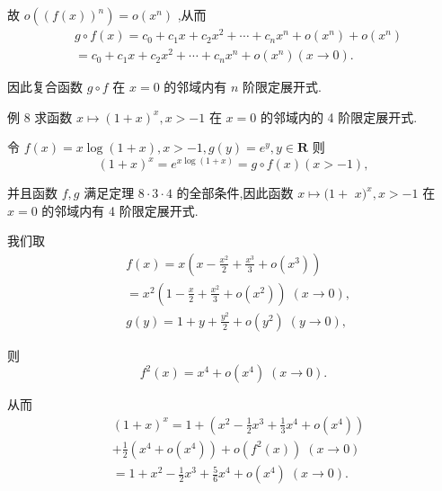 故 $o\left( {\left( f\left( x\right) \right) }^{n}\right)  = o\left( {x}^{n}\right)$ ,从而
\begin{align*}
	&g \circ  f\left( x\right)  = {c}_{0} + {c}_{1}x + {c}_{2}{x}^{2} + \cdots  + {c}_{n}{x}^{n} + o\left( {x}^{n}\right)  + o\left( {x}^{n}\right)\\
	&= {c}_{0} + {c}_{1}x + {c}_{2}{x}^{2} + \cdots  + {c}_{n}{x}^{n} + o\left( {x}^{n}\right) \left( {x \rightarrow  0}\right) .
\end{align*}

因此复合函数 $g \circ  f$ 在 $x = 0$ 的邻域内有 $n$ 阶限定展开式.

例 8 求函数 $x \mapsto  {\left( 1 + x\right) }^{x},x >  - 1$ 在 $x = 0$ 的邻域内的 4 阶限定展开式.

令 $f\left( x\right)  = x\log \left( {1 + x}\right) ,x >  - 1,g\left( y\right)  = {e}^{y},y \in  \mathbf{R}$ 则
$${\left( 1 + x\right) }^{x} = {e}^{x\log \left( {1 + x}\right) } = g \circ  f\left( x\right) \left( {x >  - 1}\right) ,$$

并且函数 $f,g$ 满足定理 $8 \cdot  3 \cdot  4$ 的全部条件,因此函数 $x \mapsto  (1 +$  $x{)}^{x},x >  - 1$ 在 $x = 0$ 的邻域内有 4 阶限定展开式.

我们取
\begin{align*}
	&f\left( x\right)  = x\left( {x - \frac{{x}^{2}}{2} + \frac{{x}^{3}}{3} + o\left( {x}^{3}\right) }\right)\\
	&= {x}^{2}\left( {1 - \frac{x}{2} + \frac{{x}^{2}}{3} + o\left( {x}^{2}\right) }\right) \;\left( {x \rightarrow  0}\right) ,\\
	&g\left( y\right)  = 1 + y + \frac{{y}^{2}}{2} + o\left( {y}^{2}\right) \;\left( {y \rightarrow  0}\right) ,
\end{align*}

则
$${f}^{2}\left( x\right)  = {x}^{4} + o\left( {x}^{4}\right) \;\left( {x \rightarrow  0}\right) .$$

从而
\begin{align*}
	&{\left( 1 + x\right) }^{x} = 1 + \left( {{x}^{2} - \frac{1}{2}{x}^{3} + \frac{1}{3}{x}^{4} + o\left( {x}^{4}\right) }\right)\\
	&+ \frac{1}{2}\left( {{x}^{4} + o\left( {x}^{4}\right) }\right)  + o\left( {{f}^{2}\left( x\right) }\right) \;\left( {x \rightarrow  0}\right)\\
	&= 1 + {x}^{2} - \frac{1}{2}{x}^{3} + \frac{5}{6}{x}^{4} + o\left( {x}^{4}\right) \;\left( {x \rightarrow  0}\right) .
\end{align*}

